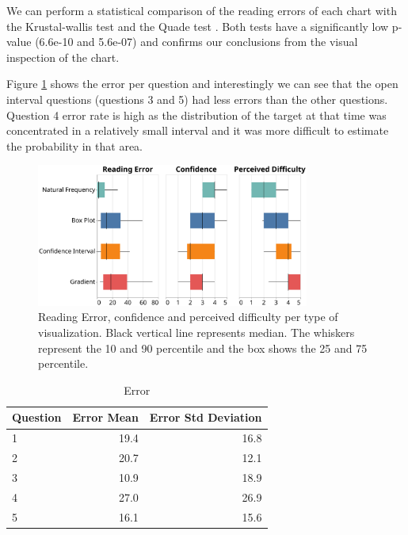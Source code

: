 \documentclass[a4paper,3p,sort&compress]{elsarticle}
\begin{document}
We can perform a statistical comparison of the reading errors of each chart with the Krustal-wallis test \cite{krustal} and 
the Quade test \cite{quade_rank_1967}. Both tests have a 
significantly low p-value (6.6e-10 and 5.6e-07) and confirms our conclusions from the visual inspection of the chart.

Figure \ref{table:resultsperquestion} shows the error per question and interestingly we can see that the open interval questions (questions 3 and 5) 
had less errors than the other questions. Question 4 error rate is high as the distribution of the target at that time was concentrated in a relatively 
small interval and it was more difficult to estimate the probability in that area. 

\begin{figure}
  \centering
  \includegraphics[width=0.8\textwidth]{comparison}
  \caption{\label{figure:errors}Reading Error, confidence and perceived difficulty per 
  type of visualization. Black vertical line represents median.
  The whiskers represent the 10 and 90 percentile and the box shows the 25 and 
  75 percentile.}
\end{figure}


\begin{table}[h!]
  \centering
  \begin{tabular}{lrr}
    \toprule
    {}Question &     Error Mean &        Error Std Deviation \\
    \midrule
    1 &  19.4 &  16.8 \\
    2 &  20.7 &  12.1 \\
    3 &  10.9 &  18.9 \\
    4 &  27.0 &  26.9 \\
    5 &  16.1 &  15.6 \\
    \bottomrule
    \end{tabular}
  \caption{Error}
  \label{table:resultsperquestion}
  \end{table}
\end{document}
